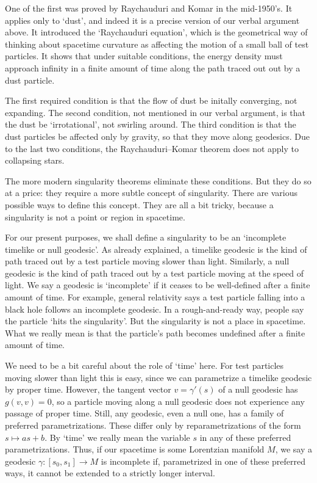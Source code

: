 \documentclass[12pt]{article}
\newcommand{\maps}{\colon}
\begin{document}
One of the first was proved by Raychauduri \cite{Raychauduri} and Komar \cite{Komar}
in the mid-1950's.   It applies only to  `dust', and indeed it is a precise version of our verbal argument above.   It introduced the `Raychauduri equation', which is the geometrical way of thinking about spacetime curvature as affecting the motion of a small ball of test particles.   It shows that under suitable conditions, the energy density must approach infinity in a finite amount of time along the path traced out out by a dust particle.   

The first required condition is that the flow of dust be initally converging, not expanding.  The second condition, not mentioned in our verbal argument, is that the dust be `irrotational', not swirling around.     The third condition is that the dust particles be affected only by gravity, so that they move along geodesics.   Due to the last two conditions, the Raychauduri--Komar theorem does not apply to collapsing stars.

The more modern singularity theorems eliminate these conditions.  But they do so at a price: they require a more subtle concept of singularity.   There are various possible ways to define this concept.  They are all a bit tricky, because a singularity is not a point or region in spacetime.  

For our present purposes, we shall define a singularity to be an `incomplete timelike or null geodesic'.    As already explained, a timelike geodesic is the kind of path traced out by a test  particle moving slower than light.  Similarly, a null geodesic is the kind of path traced out by a test particle moving at the speed of light.   We say a geodesic is `incomplete' if it ceases to be well-defined after a finite amount of time.   For example, general relativity says a test particle falling into a black hole follows an incomplete geodesic.   In a rough-and-ready way, people say the particle `hits the singularity'.   But the singularity is not a place in spacetime.  What we really mean is that the particle's path becomes undefined after a finite amount of time.

We need to be a bit careful about the role of `time' here.  For test particles moving slower than light this is easy, since we can parametrize a timelike geodesic by proper time.  However, the tangent vector $v = \gamma'(s)$ of a null geodesic has $g(v,v) = 0$, so a particle moving along a null geodesic does not experience any passage of proper time.  Still, any geodesic, even a null one, has a family of preferred parametrizations.  These differ only by reparametrizations of the form $s \mapsto as + b$.   By `time' we really mean the variable $s$ in any of these preferred parametrizations.   Thus, if our spacetime is some Lorentzian manifold $M$, we say a geodesic $\gamma \maps [s_0, s_1] \to M$ is incomplete if, parametrized in one of these preferred ways, it cannot be extended to a strictly longer interval.  
\end{document}
